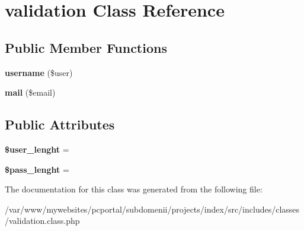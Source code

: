 \hypertarget{classvalidation}{
\section{\-v\-a\-l\-i\-d\-a\-t\-i\-o\-n \-C\-l\-a\-s\-s \-R\-e\-f\-e\-r\-e\-n\-c\-e}
\label{classvalidation}
}
\subsection*{Public Member Functions}
\begin{DoxyCompactItemize}
\item 
\hypertarget{classvalidation_a12d57a462819f55ae916ed946a8e7a4c}{
{\bfseries \-u\-s\-e\-r\-n\-a\-m\-e} \-(\$\-u\-s\-e\-r\-)}
\label{classvalidation_a12d57a462819f55ae916ed946a8e7a4c}

\item 
\hypertarget{classvalidation_ae4ec946d76ba50234436e7629b912513}{
{\bfseries \-m\-a\-i\-l} \-(\$\-e\-m\-a\-i\-l\-)}
\label{classvalidation_ae4ec946d76ba50234436e7629b912513}

\end{DoxyCompactItemize}
\subsection*{Public Attributes}
\begin{DoxyCompactItemize}
\item 
\hypertarget{classvalidation_a590f9363b33dfe3f335568478d7fa599}{
{\bfseries \$\-u\-s\-e\-r\_\-\-l\-e\-n\-g\-h\-t} = }
\label{classvalidation_a590f9363b33dfe3f335568478d7fa599}

\item 
\hypertarget{classvalidation_abb96f280948416eb7b001f5a3d245b92}{
{\bfseries \$\-p\-a\-s\-s\_\-\-l\-e\-n\-g\-h\-t} = }
\label{classvalidation_abb96f280948416eb7b001f5a3d245b92}

\end{DoxyCompactItemize}


The documentation for this class was generated from the following file:\begin{DoxyCompactItemize}
\item 
\-/\-v\-a\-r\-/\-w\-w\-w\-/\-m\-y\-w\-e\-b\-s\-i\-t\-e\-s\-/\-p\-c\-p\-o\-r\-t\-a\-l\-/\-s\-u\-b\-d\-o\-m\-e\-n\-i\-i\-/\-p\-r\-o\-j\-e\-c\-t\-s\-/\-i\-n\-d\-e\-x\-/\-s\-r\-c\-/\-i\-n\-c\-l\-u\-d\-e\-s\-/\-c\-l\-a\-s\-s\-e\-s\-/\-v\-a\-l\-i\-d\-a\-t\-i\-o\-n\-.\-c\-l\-a\-s\-s\-.\-p\-h\-p\end{DoxyCompactItemize}

